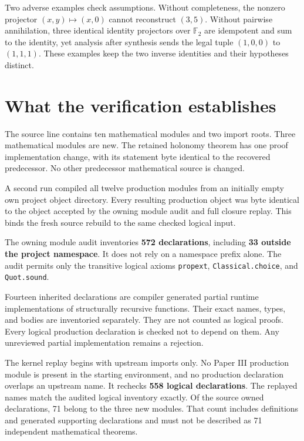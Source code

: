 \documentclass[11pt]{article}
\begin{document}
Two adverse examples check assumptions. Without completeness, the nonzero projector $(x,y)\mapsto(x,0)$ cannot reconstruct $(3,5)$. Without pairwise annihilation, three identical identity projectors over $\mathbb F_2$ are idempotent and sum to the identity, yet analysis after synthesis sends the legal tuple $(1,0,0)$ to $(1,1,1)$. These examples keep the two inverse identities and their hypotheses distinct.

\section{What the verification establishes}
The source line contains ten mathematical modules and two import roots. Three mathematical modules are new. The retained holonomy theorem has one proof implementation change, with its statement byte identical to the recovered predecessor. No other predecessor mathematical source is changed.

A second run compiled all twelve production modules from an initially empty own project object directory. Every resulting production object was byte identical to the object accepted by the owning module audit and full closure replay. This binds the fresh source rebuild to the same checked logical input.

The owning module audit inventories \textbf{572 declarations}, including \textbf{33 outside the project namespace}. It does not rely on a namespace prefix alone. The audit permits only the transitive logical axioms \texttt{propext}, \texttt{Classical.choice}, and \texttt{Quot.sound}.

Fourteen inherited declarations are compiler generated partial runtime implementations of structurally recursive functions. Their exact names, types, and bodies are inventoried separately. They are not counted as logical proofs. Every logical production declaration is checked not to depend on them. Any unreviewed partial implementation remains a rejection.

The kernel replay begins with upstream imports only. No Paper III production module is present in the starting environment, and no production declaration overlaps an upstream name. It rechecks \textbf{558 logical declarations}. The replayed names match the audited logical inventory exactly. Of the source owned declarations, 71 belong to the three new modules. That count includes definitions and generated supporting declarations and must not be described as 71 independent mathematical theorems.
\end{document}

